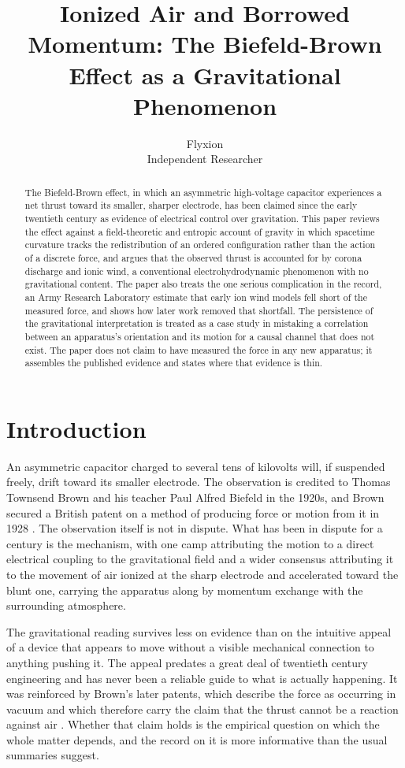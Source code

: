 \documentclass[11pt]{article}
\title{Ionized Air and Borrowed Momentum: The Biefeld-Brown Effect as a Gravitational Phenomenon}
\author{Flyxion \\ \small Independent Researcher}
\date{}
\begin{document}
\maketitle

\begin{abstract}
The Biefeld-Brown effect, in which an asymmetric high-voltage capacitor experiences a net thrust toward its smaller, sharper electrode, has been claimed since the early twentieth century as evidence of electrical control over gravitation. This paper reviews the effect against a field-theoretic and entropic account of gravity in which spacetime curvature tracks the redistribution of an ordered configuration rather than the action of a discrete force, and argues that the observed thrust is accounted for by corona discharge and ionic wind, a conventional electrohydrodynamic phenomenon with no gravitational content. The paper also treats the one serious complication in the record, an Army Research Laboratory estimate that early ion wind models fell short of the measured force, and shows how later work removed that shortfall. The persistence of the gravitational interpretation is treated as a case study in mistaking a correlation between an apparatus's orientation and its motion for a causal channel that does not exist. The paper does not claim to have measured the force in any new apparatus; it assembles the published evidence and states where that evidence is thin.
\end{abstract}

\section{Introduction}

An asymmetric capacitor charged to several tens of kilovolts will, if suspended freely, drift toward its smaller electrode. The observation is credited to Thomas Townsend Brown and his teacher Paul Alfred Biefeld in the 1920s, and Brown secured a British patent on a method of producing force or motion from it in 1928 \cite{Brown1928}. The observation itself is not in dispute. What has been in dispute for a century is the mechanism, with one camp attributing the motion to a direct electrical coupling to the gravitational field and a wider consensus attributing it to the movement of air ionized at the sharp electrode and accelerated toward the blunt one, carrying the apparatus along by momentum exchange with the surrounding atmosphere.

The gravitational reading survives less on evidence than on the intuitive appeal of a device that appears to move without a visible mechanical connection to anything pushing it. The appeal predates a great deal of twentieth century engineering and has never been a reliable guide to what is actually happening. It was reinforced by Brown's later patents, which describe the force as occurring in vacuum and which therefore carry the claim that the thrust cannot be a reaction against air \cite{Brown1965}. Whether that claim holds is the empirical question on which the whole matter depends, and the record on it is more informative than the usual summaries suggest.
\end{document}
